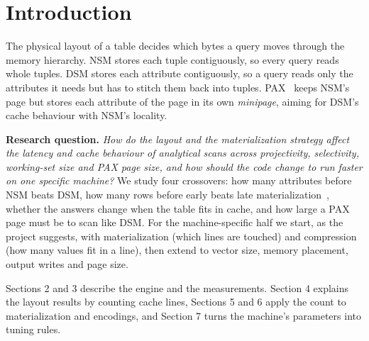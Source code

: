 \section{Introduction}
The physical layout of a table decides which bytes a query moves through the memory hierarchy.
NSM stores each tuple contiguously, so every query reads whole tuples. DSM stores each attribute
contiguously, so a query reads only the attributes it needs but has to stitch them back into
tuples. PAX~\cite{pax} keeps NSM's page but stores each attribute of the page in its own
\emph{minipage}, aiming for DSM's cache behaviour with NSM's locality.

\textbf{Research question.} \emph{How do the layout and the materialization strategy affect the
latency and cache behaviour of analytical scans across projectivity, selectivity, working-set
size and PAX page size, and how should the code change to run faster on one specific machine?}
We study four crossovers: how many attributes before NSM beats DSM, how many rows before early
beats late materialization~\cite{abadi}, whether the answers change when the table fits in
cache, and how large a PAX page must be to scan like DSM. For the machine-specific half we
start, as the project suggests, with materialization (which lines are touched) and compression
(how many values fit in a line), then extend to vector size, memory placement, output writes
and page size.

Sections 2 and 3 describe the engine and the measurements. Section 4 explains the layout
results by counting cache lines, Sections 5 and 6 apply the count to materialization and
encodings, and Section 7 turns the machine's parameters into tuning rules.
